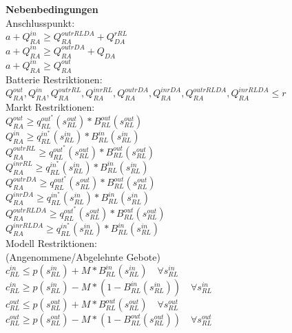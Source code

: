 \documentclass{article}
\begin{document}
\textbf{Nebenbedingungen}\\
Anschlusspunkt:\\
$a + Q^{in}_{RA} \geq Q^{outrRLDA}_{RA} + Q^{rRL}_{DA}$ \\
$a + Q^{in}_{RA} \geq Q^{outrDA}_{RA} + Q_{DA}$ \\
$a + Q^{in}_{RA} \geq Q^{out}_{RA}$ \\
Batterie Restriktionen:\\
$Q^{out}_{RA}, Q^{in}_{RA}, Q^{outrRL}_{RA}, Q^{inrRL}_{RA}, Q^{outrDA}_{RA}, Q^{inrDA}_{RA}, Q^{outrRLDA}_{RA}, Q^{inrRLDA}_{RA} \leq r$\\
Markt Restriktionen:\\
$Q^{out}_{RA} \geq q^{out^*}_{RL} (s^{out}_{RL}) * B^{out}_{RL} (s^{out}_{RL}) $\\
$Q^{in}_{RA} \geq q^{in^*}_{RL} (s^{in}_{RL}) * B^{in}_{RL} (s^{in}_{RL}) $\\
$Q^{outrRL}_{RA} \geq q^{out^*}_{RL} (s^{out}_{RL}) * B^{out}_{RL} (s^{out}_{RL}) $\\
$Q^{inrRL}_{RA} \geq q^{in^*}_{RL} (s^{in}_{RL}) * B^{in}_{RL} (s^{in}_{RL}) $\\
$Q^{outrDA}_{RA} \geq q^{out^*}_{RL} (s^{out}_{RL}) * B^{out}_{RL} (s^{out}_{RL}) $\\
$Q^{inrDA}_{RA} \geq q^{in^*}_{RL} (s^{in}_{RL}) * B^{in}_{RL} (s^{in}_{RL}) $\\
$Q^{outrRLDA}_{RA} \geq q^{out^*}_{RL} (s^{out}_{RL}) * B^{out}_{RL} (s^{out}_{RL}) $\\
$Q^{inrRLDA}_{RA} \geq q^{in^*}_{RL} (s^{in}_{RL}) * B^{in}_{RL} (s^{in}_{RL}) $\\
Modell Restriktionen:\\
(Angenommene/Abgelehnte Gebote)\\
$c^{in}_{RL} \leq p(s^{in}_{RL}) + M * B^{in}_{RL}(s^{in}_{RL})\quad\forall s^{in}_{RL} $ \\
$c^{in}_{RL} \geq p(s^{in}_{RL}) - M * (1 - B^{in}_{RL}(s^{in}_{RL}))\quad\forall s^{in}_{RL} $ \\
$c^{out}_{RL} \leq p(s^{out}_{RL}) + M * B^{out}_{RL}(s^{out}_{RL})\quad\forall s^{out}_{RL} $ \\
$c^{out}_{RL} \geq p(s^{out}_{RL}) - M * (1 - B^{out}_{RL}(s^{out}_{RL}))\quad\forall s^{out}_{RL} $ \\
\end{document}
